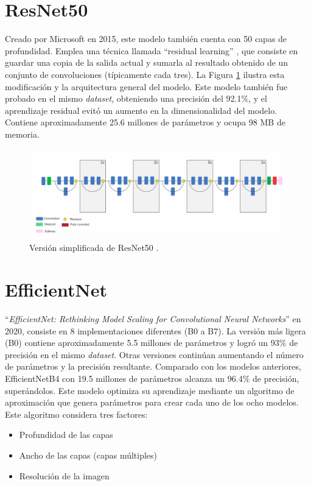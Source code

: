 \section{ResNet50} 
Creado por Microsoft en 2015, este modelo también cuenta con 50 capas de
profundidad. Emplea una técnica llamada “residual learning”
\cite{He2015}, que consiste en guardar una copia de la salida actual y
sumarla al resultado obtenido de un conjunto de convoluciones (típicamente
cada tres). La Figura \ref{ResNet} ilustra esta modificación y la arquitectura
general del modelo. Este modelo también fue probado en el mismo
\textit{dataset}, obteniendo una precisión del 92.1\%, y el aprendizaje
residual evitó un aumento en la dimensionalidad del modelo.
Contiene aproximadamente 25.6 millones de parámetros y ocupa 98 MB de memoria.

\begin{figure}[h!] 
    \includegraphics[width=1\textwidth]{images/ResNet.png} 
    \centering 
    \caption{Versión simplificada de ResNet50 \protect\cite{modelos}.} 
    \label{ResNet} 
\end{figure}

\section{EfficientNet} 
``\textit{EfficientNet: Rethinking Model Scaling for 
Convolutional Neural Networks}''\cite{Tan2020} en 2020, 
consiste en 8 implementaciones diferentes (B0 a B7).
La versión más ligera (B0) contiene aproximadamente 5.5 
millones de parámetros y logró un 93\% de precisión en el 
mismo \textit{dataset}. Otras versiones continúan aumentando 
el número de parámetros y la precisión resultante. Comparado 
con los modelos anteriores, EfficientNetB4 con 19.5 millones 
de parámetros alcanza un 96.4\% de precisión, superándolos.
Este modelo optimiza su aprendizaje mediante un algoritmo de 
aproximación que genera parámetros para crear cada uno de 
los ocho modelos. Este algoritmo considera tres factores:

\begin{itemize} 
    \item Profundidad de las capas 
    \item Ancho de las capas (capas múltiples) 
    \item Resolución de la imagen 
\end{itemize} 


